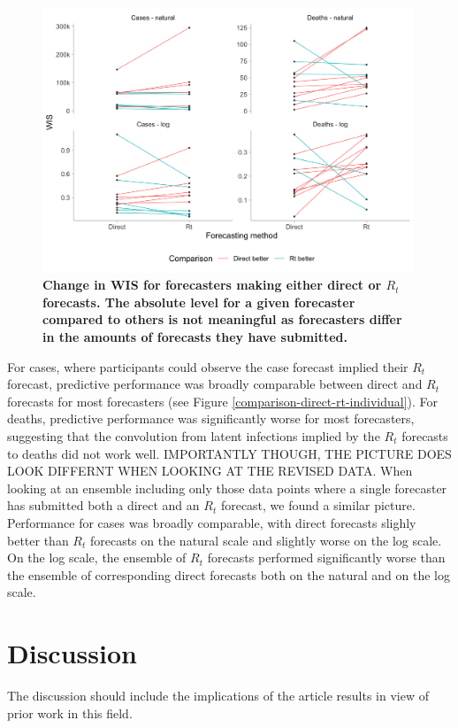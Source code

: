 \documentclass[10pt,a4paper,twocolumn]{article}
\begin{document}
\begin{figure}[H]
\centering
\includegraphics[width=0.99\textwidth]{../output/figures/comparison-direct-rt-individual.png}
\caption{\bf{Change in WIS for forecasters making either direct or $R_t$ forecasts. The absolute level for a given forecaster compared to others is not meaningful as forecasters differ in the amounts of forecasts they have submitted.}}
\label{fig:comparison-direct-rt-individual}
\end{figure}

For cases, where participants could observe the case forecast implied their $R_t$ forecast, predictive performance was broadly comparable between direct and $R_t$ forecasts for most forecasters (see Figure \ref{comparison-direct-rt-individual}). For deaths, predictive performance was significantly worse for most forecasters, suggesting that the convolution from latent infections implied by the $R_t$ forecasts to deaths did not work well. IMPORTANTLY THOUGH, THE PICTURE DOES LOOK DIFFERNT WHEN LOOKING AT THE REVISED DATA. When looking at an ensemble including only those data points where a single forecaster has submitted both a direct and an $R_t$ forecast, we found a similar picture. Performance for cases was broadly comparable, with direct forecasts slighly better than $R_t$ forecasts on the natural scale and slightly worse on the log scale. On the log scale, the ensemble of $R_t$ forecasts performed significantly worse than the ensemble of corresponding direct forecasts both on the natural and on the log scale. 


\section*{Discussion}
The discussion should include the implications of the article results in view of prior work in this field.
\end{document}

